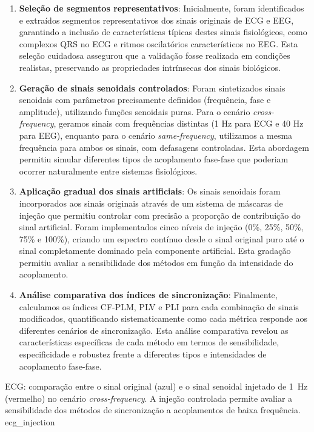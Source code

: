 \begin{enumerate}
    \item \textbf{Seleção de segmentos representativos}: Inicialmente, foram identificados e extraídos segmentos representativos dos sinais originais de ECG e EEG, garantindo a inclusão de características típicas destes sinais fisiológicos, como complexos QRS no ECG e ritmos oscilatórios característicos no EEG. Esta seleção cuidadosa assegurou que a validação fosse realizada em condições realistas, preservando as propriedades intrínsecas dos sinais biológicos.

    \item \textbf{Geração de sinais senoidais controlados}: Foram sintetizados sinais senoidais com parâmetros precisamente definidos (frequência, fase e amplitude), utilizando funções senoidais puras. Para o cenário \textit{cross-frequency}, geramos sinais com frequências distintas (1 Hz para ECG e 40 Hz para EEG), enquanto para o cenário \textit{same-frequency}, utilizamos a mesma frequência para ambos os sinais, com defasagens controladas. Esta abordagem permitiu simular diferentes tipos de acoplamento fase-fase que poderiam ocorrer naturalmente entre sistemas fisiológicos.

    \item \textbf{Aplicação gradual dos sinais artificiais}: Os sinais senoidais foram incorporados aos sinais originais através de um sistema de máscaras de injeção que permitiu controlar com precisão a proporção de contribuição do sinal artificial. Foram implementados cinco níveis de injeção (0\%, 25\%, 50\%, 75\% e 100\%), criando um espectro contínuo desde o sinal original puro até o sinal completamente dominado pela componente artificial. Esta gradação permitiu avaliar a sensibilidade dos métodos em função da intensidade do acoplamento.

    \item \textbf{Análise comparativa dos índices de sincronização}: Finalmente, calculamos os índices CF-PLM, PLV e PLI para cada combinação de sinais modificados, quantificando sistematicamente como cada métrica responde aos diferentes cenários de sincronização. Esta análise comparativa revelou as características específicas de cada método em termos de sensibilidade, especificidade e robustez frente a diferentes tipos e intensidades de acoplamento fase-fase.
\end{enumerate}

\clearpage
{}
{ECG: comparação entre o sinal original (azul) e o sinal senoidal injetado de 1~Hz (vermelho) no cenário \textit{cross-frequency}. A injeção controlada permite avaliar a sensibilidade dos métodos de sincronização a acoplamentos de baixa frequência.}
{ecg_injection}


